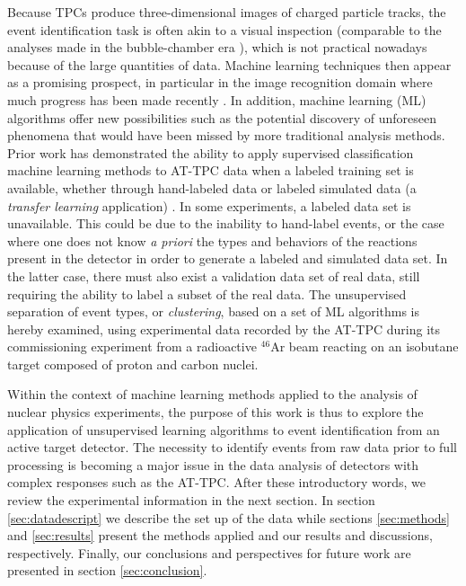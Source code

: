 \documentclass[preprint,12pt]{elsarticle}
\begin{document}
Because TPCs produce three-dimensional images of charged particle tracks, the event identification task is often akin to a visual inspection (comparable to the analyses made in the bubble-chamber era \cite{Hough:1959}), which is not practical nowadays because of the large quantities of data. Machine learning techniques then appear as a promising prospect, in particular in the image recognition domain where much progress has been made recently \cite{mehta2019}. In addition, machine learning (ML) algorithms offer new possibilities such as the potential discovery of unforeseen phenomena that would have been missed by more traditional analysis methods. Prior work has demonstrated the ability to apply supervised classification machine learning methods to AT-TPC data when a labeled training set is available, whether through hand-labeled data or labeled simulated data (a {\em transfer learning} application) \cite{Kuchera2019}. In some experiments, a labeled data set is unavailable. This could be  due to the inability to hand-label events, or the case where one does not know {\em a priori} the types and behaviors of the reactions present in the detector in order to generate a labeled and simulated data set. In the latter case, there must also exist a validation data set of real data, still requiring the ability to label a subset of the real data. The unsupervised separation of event types, or {\em clustering}, based on a set of ML algorithms is hereby examined, using experimental data recorded by the AT-TPC during its commissioning experiment from a radioactive $^{46}$Ar beam reacting on an isobutane target composed of proton and carbon nuclei. 

Within the context of machine learning methods applied to the analysis of nuclear physics experiments, 
the purpose of this work is thus to explore the application of unsupervised learning algorithms to event identification from an active target detector. The necessity to identify events from raw data prior to full processing is becoming a major issue in the data analysis of detectors with complex responses such as the AT-TPC.  After these introductory words, we review the experimental information in the next section. In section \ref{sec:datadescript} we describe the set up of the data while sections \ref{sec:methods} and \ref{sec:results}
present the methods applied and our results and discussions, respectively. Finally, our conclusions and perspectives for future work are presented in section \ref{sec:conclusion}.
\end{document}
